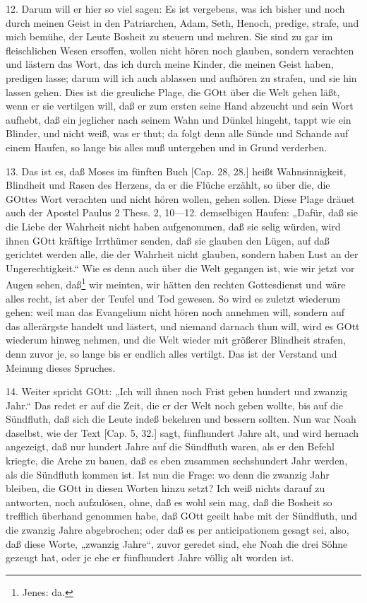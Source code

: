 12. Darum will er hier so viel sagen: Es ist vergebens, was ich bisher und noch durch meinen Geist in den Patriarchen, Adam, Seth, Henoch, predige, strafe, und mich bemühe, der Leute Bosheit zu steuern und mehren. Sie sind zu gar im fleischlichen Wesen ersoffen, wollen nicht hören noch glauben, sondern verachten und lästern das Wort, das ich durch meine Kinder, die meinen Geist haben, predigen lasse; darum will ich auch ablassen und aufhören zu strafen, und sie hin lassen gehen. Dies ist die greuliche Plage, die GOtt über die Welt gehen läßt, wenn er sie vertilgen will, daß er zum ersten seine Hand abzeucht und sein Wort aufhebt, daß ein jeglicher nach seinem Wahn und Dünkel hingeht, tappt wie ein Blinder, und nicht weiß, was er thut; da folgt denn alle Sünde und Schande auf einem Haufen, so lange bis alles muß untergehen und in Grund verderben.

13. Das ist es, daß Moses im fünften Buch [Cap. 28, 28.] heißt Wahnsinnigkeit, Blindheit und Rasen des Herzens, da er die Flüche erzählt, so über die, die GOttes Wort verachten und nicht hören wollen, gehen sollen. Diese Plage dräuet auch der Apostel Paulus 2 Thess. 2, 10—12. demselbigen Haufen: „Dafür, daß sie die Liebe der Wahrheit nicht haben aufgenommen, daß sie selig würden, wird ihnen GOtt kräftige Irrthümer senden, daß sie glauben den Lügen, auf daß gerichtet werden alle, die der Wahrheit nicht glauben, sondern haben Lust an der Ungerechtigkeit.“ Wie es denn auch über die Welt gegangen ist, wie wir jetzt vor Augen sehen, daß\footnote{Jenes: da.} wir meinten, wir hätten den rechten Gottesdienst und wäre alles recht, ist aber der Teufel und Tod gewesen. So wird es zuletzt wiederum gehen: weil man das Evangelium nicht hören noch annehmen will, sondern auf das allerärgste handelt und lästert, und niemand darnach thun will, wird es GOtt wiederum hinweg nehmen, und die Welt wieder mit größerer Blindheit strafen, denn zuvor je, so lange bis er endlich alles vertilgt. Das ist der Verstand und Meinung dieses Spruches.

14. Weiter spricht GOtt: „Ich will ihnen noch Frist geben hundert und zwanzig Jahr.“ Das redet er auf die Zeit, die er der Welt noch geben wollte, bis auf die Sündfluth, daß sich die Leute indeß bekehren und bessern sollten. Nun war Noah daselbst, wie der Text [Cap. 5, 32.] sagt, fünfhundert Jahre alt, und wird hernach angezeigt, daß nur hundert Jahre auf die Sündfluth waren, als er den Befehl kriegte, die Arche zu bauen, daß es eben zusammen sechshundert Jahr werden, als die Sündfluth kommen ist. Ist nun die Frage: wo denn die zwanzig Jahr bleiben, die GOtt in diesen Worten hinzu setzt? Ich weiß nichts darauf zu antworten, noch aufzulösen, ohne, daß es wohl sein mag, daß die Bosheit so trefflich überhand genommen habe, daß GOtt geeilt habe mit der Sündfluth, und die zwanzig Jahre abgebrochen; oder daß es per anticipationem gesagt sei, also, daß diese Worte, „zwanzig Jahre“, zuvor geredet sind, ehe Noah die drei Söhne gezeugt hat, oder je ehe er fünfhundert Jahre völlig alt worden ist.


